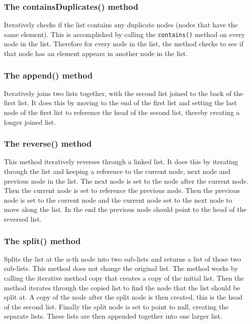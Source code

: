 \documentclass{article}
\begin{document}
\subsubsection{The containsDuplicates() method}
Iteratively checks if the list contains any duplicate nodes (nodes that have the same element). This is accomplished by calling the \verb+contains()+ method on every node in the list. Therefore for every node in the list, the method checks to see if that node has an element appears in another node in the list.

\subsubsection{The append() method}
Iteratively joins two lists together, with the second list joined to the back of the first list. It does this by moving to the end of the first list and setting the last node of the first list to reference the head of the second list, thereby creating a longer joined list.

\subsubsection{The reverse() method}
This method iteratively reverses through a linked list. It does this by iterating through the list and keeping a reference to the current node, next node and previous node in the list. The next node is set to the node after the current node. Then the current node is set to reference the previous node. Then the previous node is set to the current node and the current node set to the next node to move along the list. In the end the previous node should point to the head of the reversed list.

\subsubsection{The split() method}
Splits the list at the n-th node into two sub-lists and returns a list of those two sub-lists. This method does not change the original list. The method works by calling the iterative method copy that creates a copy of the initial list. Then the method iterates through the copied list to find the node that the list should be split at. A copy of the node after the split node is then created, this is the head of the second list. Finally the split node is set to point to null, creating the separate lists. These lists are then appended together into one larger list.
\end{document}
